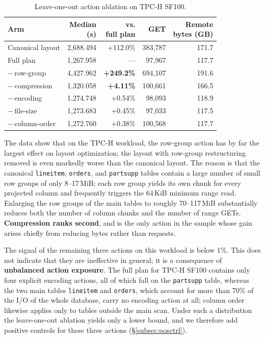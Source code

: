 \begin{table}[t]
\centering
\caption{Leave-one-out action ablation on TPC-H SF100.}
\label{tab:ablation}
\footnotesize
\setlength{\tabcolsep}{4pt}
\begin{tabular}{@{}lrrrr@{}}
\toprule
Arm & \makecell[r]{Median\\(s)} & \makecell[r]{vs.\\full plan} & GET &
\makecell[r]{Remote\\bytes (GB)} \\
\midrule
Canonical layout       & 2{,}688.494 & +112.0\% & 383{,}787 & 171.7 \\
Full plan              & 1{,}267.958 & ---      & 97{,}967  & 117.7 \\
\midrule
$-$\,row-group         & 4{,}427.962 & \textbf{+249.2\%} & 694{,}107 & 191.6 \\
$-$\,compression       & 1{,}320.058 & \textbf{+4.11\%}  & 100{,}661 & 166.5 \\
$-$\,encoding          & 1{,}274.748 & +0.54\%  & 98{,}093  & 118.9 \\
$-$\,file-size         & 1{,}273.683 & +0.45\%  & 97{,}033  & 117.5 \\
$-$\,column-order      & 1{,}272.760 & +0.38\%  & 100{,}568 & 117.7 \\
\bottomrule
\end{tabular}
\end{table}

The data show that on the TPC-H workload, the row-group action has by far the
largest effect on layout optimization; the layout with row-group restructuring
removed is even markedly worse than the canonical layout. The reason is that the
canonical \texttt{lineitem}, \texttt{orders}, and \texttt{partsupp} tables
contain a large number of small row groups of only 8--17\,MiB; each row group
yields its own chunk for every projected column and frequently triggers the
64\,KiB minimum range read. Enlarging the row groups of the main tables to
roughly 70--117\,MiB substantially reduces both the number of column chunks and
the number of range GETs. \textbf{Compression ranks second}, and is the only
action in the sample whose gain arises chiefly from reducing bytes rather than
requests.

The signal of the remaining three actions on this workload is below 1\%. This
does not indicate that they are ineffective in general; it is a consequence of
\textbf{unbalanced action exposure}. The full plan for TPC-H SF100 contains only
four explicit encoding actions, all of which fall on the \texttt{partsupp}
table, whereas the two main tables \texttt{lineitem} and \texttt{orders}, which
account for more than 70\% of the I/O of the whole database, carry no encoding
action at all; column order likewise applies only to tables outside the main
scan. Under such a distribution the leave-one-out ablation yields only a lower
bound, and we therefore add positive controls for these three actions
(\S\ref{subsec:posctrl}).

